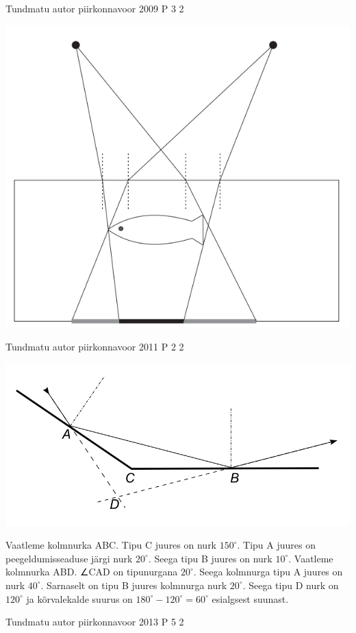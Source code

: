 \documentclass[11pt]{article}
\begin{document}
{%
{Tundmatu autor} %
{piirkonnavoor} %
{2009} %
{P 3} %
{2} %
{

\ifSolution
\begin{center}
	\includegraphics[width=0.5\linewidth]{2009-v2p-03-lah.PNG}
\end{center}
\fi
}


{Tundmatu autor} %
{piirkonnavoor} %
{2011} %
{P 2} %
{2} %
{

\ifSolution
\begin{center}
	\includegraphics[width=0.5\linewidth]{2011-v2p-02-lah.PNG}
\end{center}
Vaatleme kolmnurka ABC. Tipu C juures on nurk $150^{\circ}$. Tipu A juures on peegeldumisseaduse järgi nurk $20^{\circ}$. Seega tipu B juures on nurk $10^{\circ}$. Vaatleme kolmnurka ABD. ∠CAD on tipunurgana $20^{\circ}$. Seega kolmnurga tipu A juures on nurk $40^{\circ}$. Sarnaselt on tipu B juures kolmnurga nurk $20^{\circ}$. Seega tipu D nurk on $120^{\circ}$ ja kõrvalekalde suurus on $180^{\circ} - 120^{\circ} = 60^{\circ}$ esialgsest suunast.
\fi
}


{Tundmatu autor} %
{piirkonnavoor} %
{2013} %
{P 5} %
{2} %
{

}}
\end{document}
